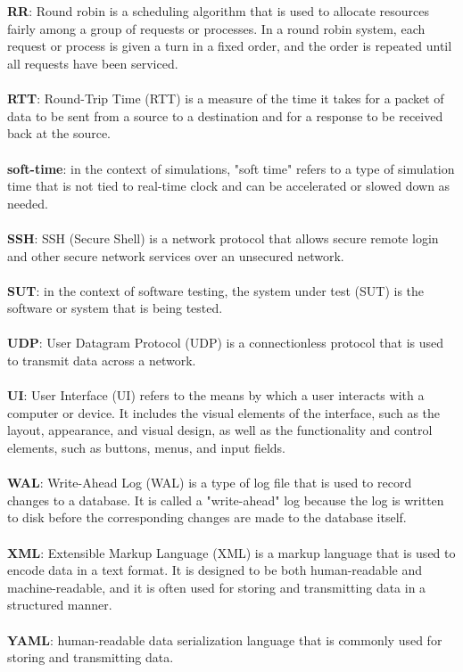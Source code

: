 \\\\
\textbf{RR}: Round robin is a scheduling algorithm that is used to allocate resources fairly among a group of requests or processes. In a round robin system, each request or process is given a turn in a fixed order, and the order is repeated until all requests have been serviced.
\\\\
\textbf{RTT}: Round-Trip Time (RTT) is a measure of the time it takes for a packet of data to be sent from a source to a destination and for a response to be received back at the source.  
\\\\
\textbf{soft-time}: in the context of simulations, "soft time" refers to a type of simulation time that is not tied to real-time clock and can be accelerated or slowed down as needed.
\\\\
\textbf{SSH}: SSH (Secure Shell) is a network protocol that allows secure remote login and other secure network services over an unsecured network.
\\\\
\textbf{SUT}: in the context of software testing, the system under test (SUT) is the software or system that is being tested.
\\\\
\textbf{UDP}: User Datagram Protocol (UDP) is a connectionless protocol that is used to transmit data across a network.
\\\\
\textbf{UI}: User Interface (UI) refers to the means by which a user interacts with a computer or device. It includes the visual elements of the interface, such as the layout, appearance, and visual design, as well as the functionality and control elements, such as buttons, menus, and input fields.
\\\\
\textbf{WAL}: Write-Ahead Log (WAL) is a type of log file that is used to record changes to a database. It is called a "write-ahead" log because the log is written to disk before the corresponding changes are made to the database itself. 
\\\\
\textbf{XML}: Extensible Markup Language (XML) is a markup language that is used to encode data in a text format. It is designed to be both human-readable and machine-readable, and it is often used for storing and transmitting data in a structured manner.
\\\\
\textbf{YAML}: human-readable data serialization language that is commonly used for storing and transmitting data. 




